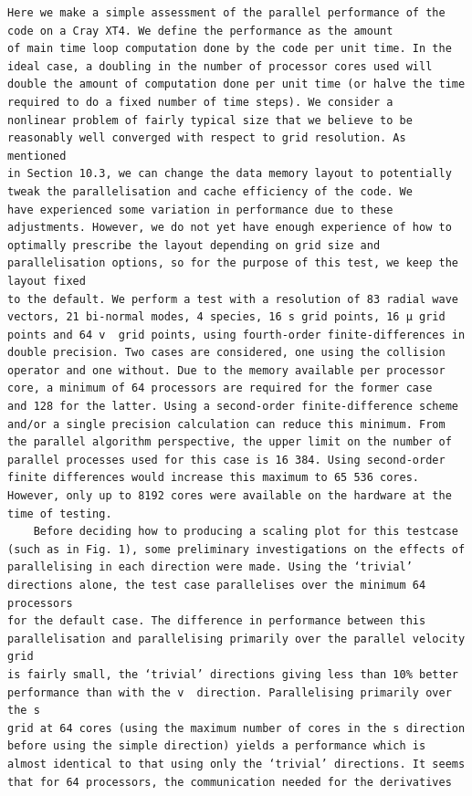 \documentclass[a4paper]{article}
\newcommand{\gkwpagefont}{\fontsize{6.0pt}{7.55pt}\selectfont}
\begin{document}
\begin{Verbatim}[fontsize=\gkwpagefont]
    Here we make a simple assessment of the parallel performance of the code on a Cray XT4. We define the performance as the amount
of main time loop computation done by the code per unit time. In the ideal case, a doubling in the number of processor cores used will
double the amount of computation done per unit time (or halve the time required to do a fixed number of time steps). We consider a
nonlinear problem of fairly typical size that we believe to be reasonably well converged with respect to grid resolution. As mentioned
in Section 10.3, we can change the data memory layout to potentially tweak the parallelisation and cache efficiency of the code. We
have experienced some variation in performance due to these adjustments. However, we do not yet have enough experience of how to
optimally prescribe the layout depending on grid size and parallelisation options, so for the purpose of this test, we keep the layout fixed
to the default. We perform a test with a resolution of 83 radial wave vectors, 21 bi-normal modes, 4 species, 16 s grid points, 16 μ grid
points and 64 v  grid points, using fourth-order finite-differences in double precision. Two cases are considered, one using the collision
operator and one without. Due to the memory available per processor core, a minimum of 64 processors are required for the former case
and 128 for the latter. Using a second-order finite-difference scheme and/or a single precision calculation can reduce this minimum. From
the parallel algorithm perspective, the upper limit on the number of parallel processes used for this case is 16 384. Using second-order
finite differences would increase this maximum to 65 536 cores. However, only up to 8192 cores were available on the hardware at the
time of testing.
    Before deciding how to producing a scaling plot for this testcase (such as in Fig. 1), some preliminary investigations on the effects of
parallelising in each direction were made. Using the ‘trivial’ directions alone, the test case parallelises over the minimum 64 processors
for the default case. The difference in performance between this parallelisation and parallelising primarily over the parallel velocity grid
is fairly small, the ‘trivial’ directions giving less than 10% better performance than with the v  direction. Parallelising primarily over the s
grid at 64 cores (using the maximum number of cores in the s direction before using the simple direction) yields a performance which is
almost identical to that using only the ‘trivial’ directions. It seems that for 64 processors, the communication needed for the derivatives

\end{Verbatim}
\end{document}
